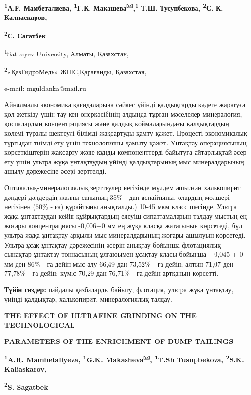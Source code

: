{\bfseries \textsuperscript{1}А.Р. Мамбеталиева, \textsuperscript{1}Г.К.
Макашева\textsuperscript{🖂},\textsuperscript{1} Т.Ш. Тусупбекова,
\textsuperscript{2}С. К. Калиаскаров,}

{\bfseries \textsuperscript{2}С. Сагатбек}

\textsuperscript{1}Satbayev University, Алматы, Қазахстан,

\textsuperscript{2}«ҚазГидроМедь» ЖШС,Қарағанды, Қазахстан,

e-mail: mguldanka@mail.ru

Айналмалы экономика қағидаларына сәйкес үйінді қалдықтарды кәдеге
жаратуға қол жеткізу үшін тау-кен өнеркәсібінің алдында тұрған мәселелер
минералогия, қоспалардың концентрациясы және қалдық қоймаларындағы
қалдықтардың көлемі туралы шектеулі білімді жақсартуды қамту қажет.
Процесті экономикалық тұрғыдан тиімді ету үшін технологияны дамыту
қажет. Ұнтақтау операциясының көрсеткіштерін жақсарту және құнды
компоненттерді байытуға айтарлықтай әсер ету үшін ультра жұқа
ұнтақтаудың үйінді қалдықтарының мыс минералдарының ашылу дәрежесіне
әсері зерттелді.

Оптикалық-минералогиялық зерттеулер негізінде мүлдем ашылған халькопирит
дәндері дәндердің жалпы санының 35\% - дан аспайтыны, олардың мөлшері
негізінен (60\% - ға) құрайтыны анықталды.) 10-45 мкм класс шегінде.
Ультра жұқа ұнтақтаудан кейін құйрықтардың елеуіш сипаттамаларын талдау
мыстың ең жоғары концентрациясы -0,006+0 мм ең жұқа класқа жататынын
көрсетеді, бұл ультра жұқа ұнтақтау арқылы мыс минералдарының жоғары
ашылуын көрсетеді. Ультра ұсақ ұнтақтау дәрежесінің әсерін анықтау
бойынша флотациялық сынақтар ұнтақтау тоннасының ұлғаюымен ұсақтау класы
бойынша -- 0,045 + 0 мм-ден 86\% - ға дейін мыс алу 66,49-дан 73,52\% -
ға дейін; алтын 71,07-ден 77,78\% - ға дейін; күміс 70,29-дан 76,71\% -
ға дейін артқанын көрсетті.

{\bfseries Түйін сөздер:} пайдалы қазбаларды байыту, флотация, ультра жұқа
ұнтақтау, үиінді қалдықтар, халькопирит, минералогиялық талдау.

{\bfseries THE EFFECT OF ULTRAFINE GRINDING ON THE TECHNOLOGICAL}

{\bfseries PARAMETERS OF THE ENRICHMENT OF DUMP TAILINGS}

{\bfseries \textsuperscript{1}A.R. Mambetaliyeva, \textsuperscript{1}G.K.
Makasheva\textsuperscript{🖂}, \textsuperscript{1}T.Sh Tusupbekova,
\textsuperscript{2}S.K. Kaliaskarov,}

{\bfseries \textsuperscript{2}S. Sagatbek}


